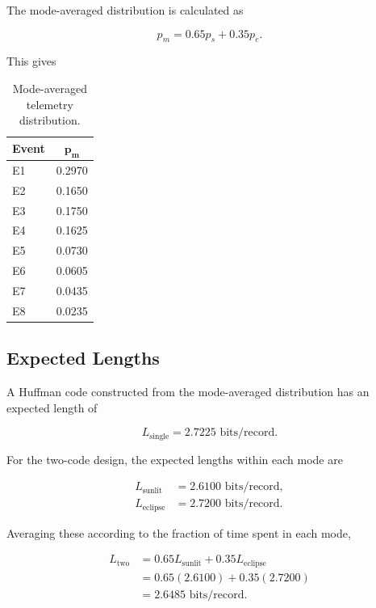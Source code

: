 \documentclass[11pt,a4paper]{article}
\begin{document}
The mode-averaged distribution is calculated as

\begin{equation}
    p_m = 0.65p_s + 0.35p_e.
\end{equation}

This gives

\begin{table}[H]
    \centering
    \caption{Mode-averaged telemetry distribution.}
    \label{tab:mode_avg}
    \begin{tabular}{lc}
        \toprule
        \textbf{Event} & \(\boldsymbol{p_m}\) \\
        \midrule
        E1 & 0.2970 \\
        E2 & 0.1650 \\
        E3 & 0.1750 \\
        E4 & 0.1625 \\
        E5 & 0.0730 \\
        E6 & 0.0605 \\
        E7 & 0.0435 \\
        E8 & 0.0235 \\
        \bottomrule
    \end{tabular}
\end{table}

\subsection{Expected Lengths}

A Huffman code constructed from the mode-averaged distribution has an
expected length of

\begin{equation}
    L_{\mathrm{single}} = 2.7225
    \text{ bits/record}.
\end{equation}

For the two-code design, the expected lengths within each mode are

\begin{align}
    L_{\mathrm{sunlit}} &= 2.6100
    \text{ bits/record},\\
    L_{\mathrm{eclipse}} &= 2.7200
    \text{ bits/record}.
\end{align}

Averaging these according to the fraction of time spent in each mode,

\begin{align}
    L_{\mathrm{two}}
    &= 0.65L_{\mathrm{sunlit}}
       + 0.35L_{\mathrm{eclipse}}\\
    &= 0.65(2.6100)+0.35(2.7200)\\
    &= \boxed{2.6485\text{ bits/record}}.
\end{align}
\end{document}
